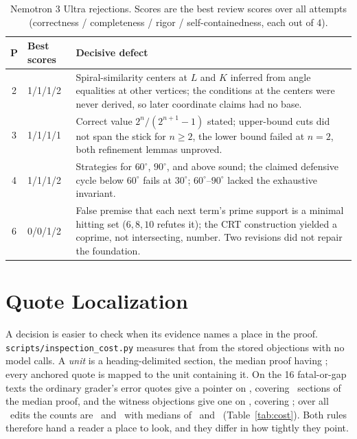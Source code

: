 \begin{table}[htbp]
  \caption{Nemotron 3 Ultra rejections. Scores are the best review scores over all attempts (correctness / completeness / rigor / self-containedness, each out of 4).}
  \label{tab:nemotron}
  \centering
  \footnotesize
  \begin{tabular}{@{}clp{8.6cm}@{}}
    \toprule
    P & Best scores & Decisive defect \\
    \midrule
    2 & 1/1/1/2 & Spiral-similarity centers at $L$ and $K$ inferred from angle equalities at other vertices; the conditions at the centers were never derived, so later coordinate claims had no base. \\
    3 & 1/1/1/1 & Correct value $2^n/(2^{n+1}-1)$ stated; upper-bound cuts did not span the stick for $n\ge2$, the lower bound failed at $n=2$, both refinement lemmas unproved. \\
    4 & 1/1/1/2 & Strategies for $60^{\circ}$, $90^{\circ}$, and above sound; the claimed defensive cycle below $60^{\circ}$ fails at $30^{\circ}$; $60^{\circ}$--$90^{\circ}$ lacked the exhaustive invariant. \\
    6 & 0/0/1/2 & False premise that each next term's prime support is a minimal hitting set ($6,8,10$ refutes it); the CRT construction yielded a coprime, not intersecting, number. Two revisions did not repair the foundation. \\
    \bottomrule
  \end{tabular}
\end{table}

\section{Quote Localization}
\label{app:cost}
A decision is easier to check when its evidence names a place in the proof. \texttt{scripts/\allowbreak inspection\_cost.py} measures that from the stored objections with no model calls. A \emph{unit} is a heading-delimited section, the median proof having \COSTUNITS; every anchored quote is mapped to the unit containing it. On the 16 fatal-or-gap texts the ordinary grader's error quotes give a pointer on \COSTGRADERLOC, covering \COSTGRADERSEC\ sections of the median proof, and the witness objections give one on \COSTWITNESSLOC, covering \COSTWITNESSSEC; over all \PLANTN\ edits the counts are \COSTALLGRADERLOC\ and \COSTALLWITNESSLOC\ with medians of \COSTALLGRADERSEC\ and \COSTALLWITNESSSEC\ (Table~\ref{tab:cost}). Both rules therefore hand a reader a place to look, and they differ in how tightly they point.

